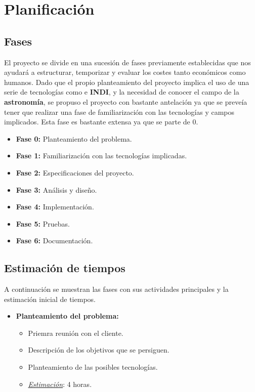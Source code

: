 \chapter{Planificación}

\section{Fases}

El proyecto se divide en una sucesión de fases previamente establecidas que nos ayudará a estructurar, temporizar y evaluar los costes tanto económicos como humanos. Dado que el propio planteamiento del proyecto implica el uso de una serie de tecnologías como  e \textbf{INDI}, y la necesidad de conocer el campo de la \textbf{astronomía}, se propuso el proyecto con bastante antelación ya que se preveía tener que realizar una fase de familiarización con las tecnologías y campos implicados. Esta fase es bastante extensa ya que se parte de 0.

\begin{itemize}
  \item \textbf{Fase 0:} Planteamiento del problema.
  \item \textbf{Fase 1:} Familiarización con las tecnologías implicadas.
  \item \textbf{Fase 2:} Especificaciones del proyecto.
  \item \textbf{Fase 3:} Análisis y diseño.
  \item \textbf{Fase 4:} Implementación.
  \item \textbf{Fase 5:} Pruebas.
  \item \textbf{Fase 6:} Documentación.
\end{itemize}

\newpage
\section{Estimación de tiempos}

A continuación se muestran las fases con sus actividades principales y la estimación inicial de tiempos.

\begin{itemize}
   \item \textbf{Planteamiento del problema:}
   \begin{itemize}
    \item Priemra reunión con el cliente.
    \item Descripción de los objetivos que se persiguen.
    \item Planteamiento de las posibles tecnologías.
    \item \underline{\textit{Estimación}}: 4 horas.
    \end{itemize}
\end{itemize}

